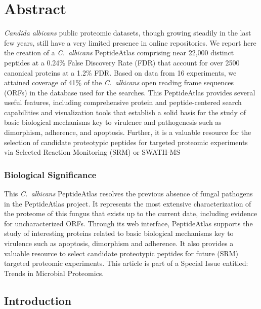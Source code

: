\newpage


%
%



\chapter*{Abstract}
\textit{Candida albicans} public proteomic datasets, though growing
 steadily in the last few years, still have a very limited presence in
 online repositories. We report here the creation of a \textit{\mbox{C. albicans}} PeptideAtlas
 comprising near 22,000 distinct peptides at a 0.24\% False Discovery
 Rate (FDR) that account for over 2500 canonical proteins at a 1.2\% FDR.
 Based on data from 16 experiments, we attained coverage of 41\% of the 
 \textit{\mbox{C. albicans}} open reading frame sequences (ORFs) in the database used 
 for the searches. This PeptideAtlas provides several useful features, 
 including comprehensive protein and peptide-centered search 
 capabilities and visualization tools that establish a solid basis for 
 the study of basic biological mechanisms key to virulence and 
 pathogenesis such as dimorphism, adherence, and apoptosis. 
 Further, it is a valuable resource for the selection of candidate 
 proteotypic peptides for targeted proteomic experiments via Selected
 Reaction Monitoring (SRM) or SWATH-MS

\subsection*{Biological Significance}
This \textit{\mbox{C. albicans}} PeptideAtlas resolves the previous absence of fungal 
pathogens in the PeptideAtlas project. It represents the most extensive
characterization of the proteome of this fungus that exists up to the 
current date, including evidence for uncharacterized ORFs. Through its 
web interface, \mbox{PeptideAtlas} supports the study of interesting proteins 
related to basic biological mechanisms key to virulence such as 
apoptosis, dimorphism and adherence. It also provides a valuable 
resource to select candidate proteotypic peptides for future (SRM) 
targeted proteomic experiments. 
This article is part of a Special Issue entitled: Trends in Microbial Proteomics.

\newpage


\section*{Introduction}

